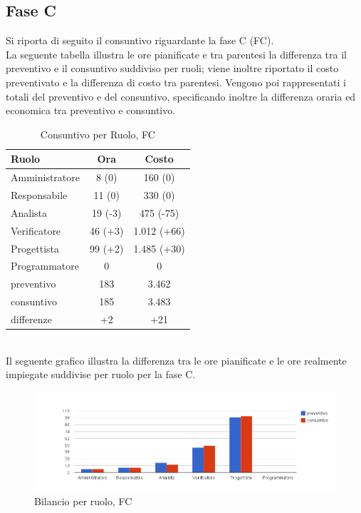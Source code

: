 \subsection{Fase C}
\label{consuntivoPrArchi}
	Si riporta di seguito il consuntivo riguardante la fase C (FC).
	\\ La seguente tabella illustra le ore pianificate e tra parentesi la differenza tra il preventivo e il consuntivo suddiviso per ruoli; viene inoltre riportato il costo preventivato e la differenza di costo tra parentesi. Vengono poi rappresentati i totali del preventivo e del consuntivo, specificando inoltre la differenza oraria ed economica tra preventivo e consuntivo.
	\begin{table}[!h]
		\centering
		\begin{tabular}{|l|c|c|}
			\hline
			Ruolo & Ora & Costo\\
			\hline
			Amministratore & 8 (0) & 160 (0)\\
			Responsabile & 11 (0) & 330 (0)\\
			Analista & 19 (-3) & 475 (-75)\\
			Verificatore & 46 (+3) & 1.012 (+66)\\
			Progettista & 99 (+2) & 1.485 (+30)\\
			Programmatore & 0 & 0\\	
			\hline
			preventivo & 183 & 3.462\\
			consuntivo & 185 & 3.483\\
			differenze & +2 & +21 \\
			\hline			
		\end{tabular}
		\caption{Consuntivo per Ruolo, FC}
	\end{table}
	\\Il seguente grafico illustra la differenza tra le ore pianificate e le ore realmente impiegate suddivise per ruolo per la fase C.
\begin{figure}[h]
	\centering
	\includegraphics[width=1.1\textwidth] {./content/Immagini/consPA.png}
	\caption{Bilancio per ruolo, FC}
	\label{bilPA}
\end{figure}	 
